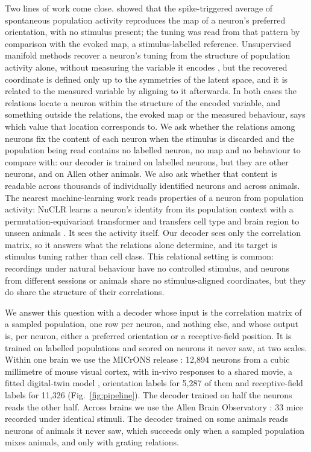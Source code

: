 \documentclass[11pt]{article}
\begin{document}
Two lines of work come close. \citet{tsodyks1999} showed that the spike-triggered average of spontaneous population activity reproduces the map of a neuron's preferred orientation, with no stimulus present; the tuning was read from that pattern by comparison with the evoked map, a stimulus-labelled reference. Unsupervised manifold methods recover a neuron's tuning from the structure of population activity alone, without measuring the variable it encodes \citep{rubin2019}, but the recovered coordinate is defined only up to the symmetries of the latent space, and it is related to the measured variable by aligning to it afterwards. In both cases the relations locate a neuron within the structure of the encoded variable, and something outside the relations, the evoked map or the measured behaviour, says which value that location corresponds to. We ask whether the relations among neurons fix the content of each neuron when the stimulus is discarded and the population being read contains no labelled neuron, no map and no behaviour to compare with: our decoder is trained on labelled neurons, but they are other neurons, and on Allen other animals. We also ask whether that content is readable across thousands of individually identified neurons and across animals. The nearest machine-learning work reads properties of a neuron from population activity: NuCLR learns a neuron's identity from its population context with a permutation-equivariant transformer and transfers cell type and brain region to unseen animals \citep{arora2025}. It sees the activity itself. Our decoder sees only the correlation matrix, so it answers what the relations alone determine, and its target is stimulus tuning rather than cell class. This relational setting is common: recordings under natural behaviour have no controlled stimulus, and neurons from different sessions or animals share no stimulus-aligned coordinates, but they do share the structure of their correlations.

We answer this question with a decoder whose input is the correlation matrix of a sampled population, one row per neuron, and nothing else, and whose output is, per neuron, either a preferred orientation or a receptive-field position. It is trained on labelled populations and scored on neurons it never saw, at two scales. Within one brain we use the MICrONS release \citep{ding2025,microns2025}: 12,894 neurons from a cubic millimetre of mouse visual cortex, with in-vivo responses to a shared movie, a fitted digital-twin model \citep{wang2025}, orientation labels for 5,287 of them and receptive-field labels for 11,326 (Fig.~\ref{fig:pipeline}). The decoder trained on half the neurons reads the other half. Across brains we use the Allen Brain Observatory \citep{devries2020}: 33 mice recorded under identical stimuli. The decoder trained on some animals reads neurons of animals it never saw, which succeeds only when a sampled population mixes animals, and only with grating relations.
\end{document}
